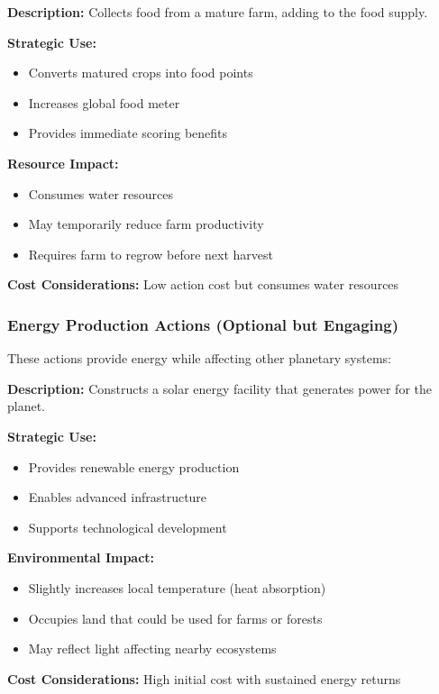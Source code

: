 \documentclass[12pt,a4paper]{article}
\begin{document}
\begin{tcolorbox}[colback=yellow!5,colframe=yellow!50!black,title=Harvest Crop]
\textbf{Description:} Collects food from a mature farm, adding to the food supply.

\textbf{Strategic Use:}
\begin{itemize}
    \item Converts matured crops into food points
    \item Increases global food meter
    \item Provides immediate scoring benefits
\end{itemize}

\textbf{Resource Impact:}
\begin{itemize}
    \item Consumes water resources
    \item May temporarily reduce farm productivity
    \item Requires farm to regrow before next harvest
\end{itemize}

\textbf{Cost Considerations:} Low action cost but consumes water resources
\end{tcolorbox}

\subsubsection{Energy Production Actions (Optional but Engaging)}

These actions provide energy while affecting other planetary systems:

\begin{tcolorbox}[colback=orange!5,colframe=orange!50!black,title=Build Solar Plant]
\textbf{Description:} Constructs a solar energy facility that generates power for the planet.

\textbf{Strategic Use:}
\begin{itemize}
    \item Provides renewable energy production
    \item Enables advanced infrastructure
    \item Supports technological development
\end{itemize}

\textbf{Environmental Impact:}
\begin{itemize}
    \item Slightly increases local temperature (heat absorption)
    \item Occupies land that could be used for farms or forests
    \item May reflect light affecting nearby ecosystems
\end{itemize}

\textbf{Cost Considerations:} High initial cost with sustained energy returns
\end{tcolorbox}
\end{document}
